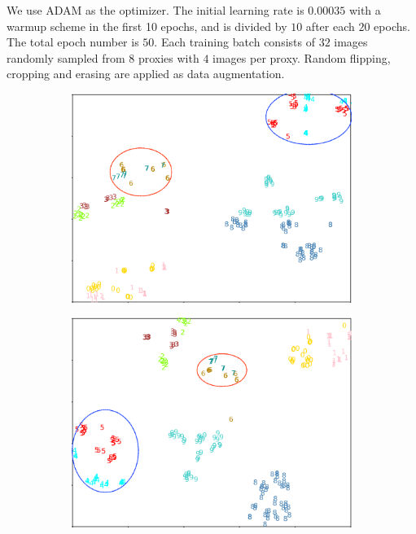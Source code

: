 \documentclass[letterpaper]{article} %
\begin{document}
We use ADAM as the optimizer. The initial learning rate is $0.00035$ with a warmup scheme in the first 10 epochs, and is divided by $10$ after each $20$ epochs. The total epoch number is $50$. Each training batch consists of $32$ images randomly sampled from $8$ proxies with $4$ images per proxy. Random flipping, cropping and erasing are applied as data augmentation.

\begin{figure}[t]
\centering
\begin{subfigure}{0.29\textwidth}
\centering
\includegraphics[width=1.0\textwidth]{./model_v10_baseline.png}
\end{subfigure}
\quad
\begin{subfigure}{0.29\textwidth}
\centering
\includegraphics[width=1.0\textwidth]{./model_v10_local.png}

\end{subfigure}
\end{figure}
\end{document}
